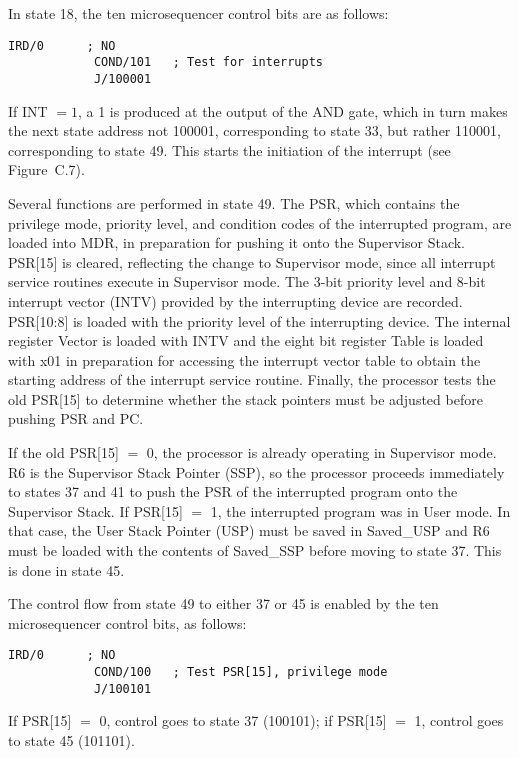 \documentclass{patt}
\begin{document}
In state 18, the ten microsequencer control bits are as follows:

\begin{lstlisting}[style=intext]
            IRD/0      ; NO
            COND/101   ; Test for interrupts
            J/100001
\end{lstlisting}

If INT $=1$, a 1 is produced at the output of the AND gate, which in
turn makes the next state address not 100001, corresponding to state
33, but rather 110001, corresponding to state 49.  This starts the
initiation of the interrupt (see Figure~C.7).

Several functions are performed in state 49.  The PSR, which contains
the privilege mode, priority level, and condition codes of the
interrupted program, are loaded into MDR, in preparation for pushing it
onto the Supervisor Stack.  PSR[15] is cleared, reflecting the change
to Supervisor mode, since all interrupt service routines execute in
Supervisor mode.  The 3-bit priority level and 8-bit interrupt vector
(INTV) provided by the interrupting device are recorded.  PSR[10:8] is
loaded with the priority level of the interrupting device.  
The internal register Vector is
loaded with INTV and the eight bit register Table is loaded with x01 in
preparation for accessing the interrupt vector table to obtain the starting
address of the interrupt service routine.  Finally, the processor tests 
the old PSR[15] to determine whether the stack pointers must be adjusted
before pushing PSR and PC.

If the old PSR[15] $=$ 0, the processor is already operating in
Supervisor mode.  R6 is the Supervisor Stack Pointer (SSP), so the
processor proceeds immediately to states 37 and 41 to push the PSR of
the interrupted program onto the Supervisor Stack.  If PSR[15] $=$ 1,
the interrupted program was in User mode.  In that case, the User Stack Pointer
(USP) must be saved in Saved\_USP and R6 must be loaded with the contents of 
Saved\_SSP before moving to state 37.  This is done in state 45.

The control flow from state 49 to either 37 or 45 is enabled by the ten
microsequencer control bits, as follows:
\begin{lstlisting}[style=intext]
            IRD/0      ; NO
            COND/100   ; Test PSR[15], privilege mode
            J/100101
\end{lstlisting}

If PSR[15] $=$ 0, control goes to state 37 (100101); if PSR[15] $=$ 1,
control goes to state 45 (101101).
\end{document}
